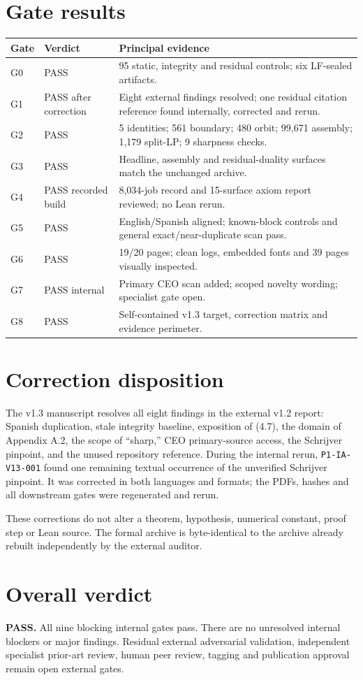\documentclass[11pt]{article}
\begin{document}
\section{Gate results}
\small
\begin{longtable}{p{.12\linewidth}p{.19\linewidth}p{.60\linewidth}}
\toprule Gate & Verdict & Principal evidence \\ \midrule
G0 & PASS & 95 static, integrity and residual controls; six LF-sealed artifacts. \\
G1 & PASS after correction & Eight external findings resolved; one residual citation reference found internally, corrected and rerun. \\
G2 & PASS & 5 identities; 561 boundary; 480 orbit; 99,671 assembly; 1,179 split-LP; 9 sharpness checks. \\
G3 & PASS & Headline, assembly and residual-duality surfaces match the unchanged archive. \\
G4 & PASS recorded build & 8,034-job record and 15-surface axiom report reviewed; no Lean rerun. \\
G5 & PASS & English/Spanish aligned; known-block controls and general exact/near-duplicate scan pass. \\
G6 & PASS & 19/20 pages; clean logs, embedded fonts and 39 pages visually inspected. \\
G7 & PASS internal & Primary CEO scan added; scoped novelty wording; specialist gate open. \\
G8 & PASS & Self-contained v1.3 target, correction matrix and evidence perimeter. \\
\bottomrule
\end{longtable}
\normalsize

\section{Correction disposition}
The v1.3 manuscript resolves all eight findings in the external v1.2 report:
Spanish duplication, stale integrity baseline, exposition of (4.7), the domain
of Appendix A.2, the scope of ``sharp,'' CEO primary-source access, the
Schrijver pinpoint, and the unused repository reference. During the internal
rerun, \texttt{P1-IA-V13-001} found one remaining textual occurrence of the
unverified Schrijver pinpoint. It was corrected in both languages and formats;
the PDFs, hashes and all downstream gates were regenerated and rerun.

These corrections do not alter a theorem, hypothesis, numerical constant,
proof step or Lean source. The formal archive is byte-identical to the archive
already rebuilt independently by the external auditor.

\section{Overall verdict}
\textbf{PASS.} All nine blocking internal gates pass. There are no unresolved
internal blockers or major findings. Residual external adversarial validation,
independent specialist prior-art review, human peer review, tagging and
publication approval remain open external gates.
\end{document}
